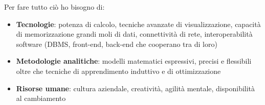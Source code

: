 Per fare tutto ciò ho bisogno di:
\begin{itemize}
	\item 
	\textbf{Tecnologie}: potenza di calcolo, tecniche avanzate di visualizzazione, capacità di memorizzazione grandi moli di dati, connettività di rete, interoperabilità software (DBMS, front-end, back-end che cooperano tra di loro)
	\item
	\textbf{Metodologie analitiche}: modelli matematici espressivi, precisi e flessibili oltre che tecniche di apprendimento induttivo e di ottimizzazione
	\item 
	\textbf{Risorse umane}: cultura aziendale, creatività, agilità mentale, disponibilità al cambiamento
	
\end{itemize}
